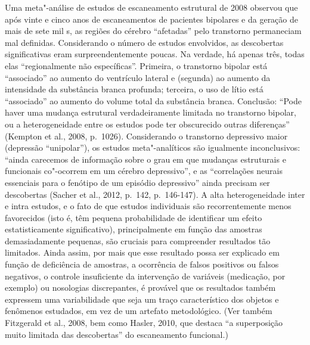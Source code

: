 Uma meta"-análise de estudos de escaneamento estrutural de 2008 observou
que após vinte e cinco anos de escaneamentos de pacientes bipolares e da
geração de mais de sete mil s, as regiões do cérebro ``afetadas''
pelo transtorno permaneciam mal definidas. Considerando o número de
estudos envolvidos, as descobertas significativas eram
surpreendentemente poucas. Na verdade, há apenas três, todas elas
``regionalmente não específicas''. Primeira, o transtorno bipolar está
``associado'' ao aumento do ventrículo lateral e (segunda) ao aumento da
intensidade da substância branca profunda; terceira, o uso de lítio está
``associado'' ao aumento do volume total da substância branca.
Conclusão: ``Pode haver uma mudança estrutural verdadeiramente limitada
no transtorno bipolar, ou a heterogeneidade entre os estudos pode ter
obscurecido outras diferenças'' (Kempton et al., 2008, p.~1026).
Considerando o transtorno depressivo maior (depressão ``unipolar''), os
estudos meta"-analíticos são igualmente inconclusivos: ``ainda carecemos
de informação sobre o grau em que mudanças estruturais e funcionais
co"-ocorrem em um cérebro depressivo'', e as ``correlações neurais
essenciais para o fenótipo de um episódio depressivo'' ainda precisam
ser descobertas (Sacher et al., 2012, p.~142, p.~146-147). A alta
heterogeneidade inter e intra estudos, e o fato de que estudos
individuais são recorrentemente menos favorecidos (isto é, têm pequena
probabilidade de identificar um efeito estatisticamente significativo),
principalmente em função das amostras demasiadamente pequenas, são
cruciais para compreender resultados tão limitados. Ainda assim, por
mais que esse resultado possa ser explicado em função de deficiência de
amostras, a ocorrência de falsos positivos ou falsos negativos, o
controle insuficiente da intervenção de variáveis (medicação, por
exemplo) ou nosologias discrepantes, é provável que os resultados também
expressem uma variabilidade que seja um traço característico dos objetos
e fenômenos estudados, em vez de um artefato metodológico. (Ver também
Fitzgerald et al., 2008, bem como Hasler, 2010, que destaca ``a
superposição muito limitada das descobertas'' do escaneamento
funcional.)

